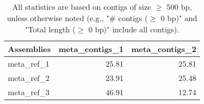 \documentclass[12pt,a4paper]{article}
\begin{document}
\begin{table}[ht]
\begin{center}
\caption{All statistics are based on contigs of size $\geq$ 500 bp, unless otherwise noted (e.g., "\# contigs ($\geq$ 0 bp)" and "Total length ($\geq$ 0 bp)" include all contigs).}
\begin{tabular}{|l*{2}{|r}|}
\hline
Assemblies & meta\_contigs\_1 & meta\_contigs\_2 \\ \hline
meta\_ref\_1 & 25.81 & 25.81 \\ \hline
meta\_ref\_2 & 23.91 & 25.48 \\ \hline
meta\_ref\_3 & 46.91 & 12.74 \\ \hline
\end{tabular}
\end{center}
\end{table}
\end{document}
